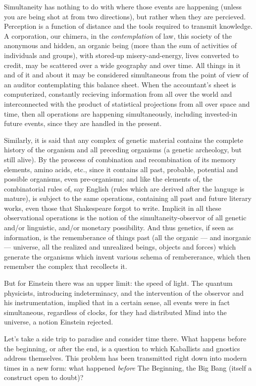 \documentclass[11pt,twoside,draft]{memoir}
\begin{document}
Simultaneity has nothing to do with where
those events are happening (unless you are
being shot at from two directions), but rather
when they are percieved. Perception is a
function of distance and the tools required to
transmit knowledge. A corporation, our
chimera, in the \emph{contemplation} of law, this
society of the anonymous and hidden, an
organic being (more than the sum of activities of individuals and groups), with
stored-up misery-and-energy, lives converted
to credit, may be scattered over a wide
geography and over time. All things in it and
of it and about it may be considered simultaneous from the point of view of an auditor
contemplating this balance sheet.
When the accountant's sheet is computerized, constantly recieving information from all over
the world and interconnected with the product of statistical projections from all over
space and time, then all operations are happening simultaneously, including invested-in future events, since they are handled in the present.

Similarly, it is said that any complex of
genetic material contains the complete history of the organism and all preceding organisms (a genetic archeology, but still
alive). By the proscess of combination and
recombination of its memory elements, amino
acids, etc., since it contains all past, probable, potential and possible organisms, even
pre-organisms; and like the elements of, the
combinatorial rules of, say English (rules
which are derived after the languge is mature), is subject to the same operations, containing all past and future literary works,
even those that Shakespeare forgot to write.
Implicit in all these observational operations
is the notion of the simultaneity-observor of
all genetic and\slash or linguistic, and\slash or monetary
possibility. And thus genetics, if seen as
information, is the rememberance of things
past (all the organic --- and inorganic --- universe, all the realized and unrealized beings,
objects and forces) which generate the organisms which invent various schema of
rembererance, which then remember the complex that recollects it.

But for Einstein there was an upper limit:
the speed of light. The quantum physicists,
introducing indeterminacy, and the intervention of the observor and his instrumentation,
implied that in a certain sense, all
events were in fact simultaneous, regardless
of clocks, for they had distributed Mind into
the universe, a notion Einstein rejected.

Let's take a side trip to paradise and consider time there. What happens before the
beginning, or after the end, is a question to
which Kaballists and gnostics address themselves. This problem has been transmitted
right down into modern times in a new form:
what happened \emph{before} The Beginning, the
Big Bang (itself a construct open to doubt)?
\end{document}
